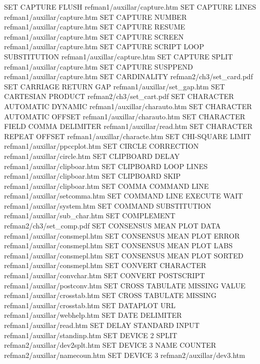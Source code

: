 SET CAPTURE FLUSH                       refman1/auxillar/capture.htm
SET CAPTURE LINES                       refman1/auxillar/capture.htm
SET CAPTURE NUMBER                      refman1/auxillar/capture.htm
SET CAPTURE RESUME                      refman1/auxillar/capture.htm
SET CAPTURE SCREEN                      refman1/auxillar/capture.htm
SET CAPTURE SCRIPT LOOP SUBSTITUTION    refman1/auxillar/capture.htm
SET CAPTURE SPLIT                       refman1/auxillar/capture.htm
SET CAPTURE SUSPPEND                    refman1/auxillar/capture.htm
SET CARDINALITY                         refman2/ch3/set_card.pdf
SET CARRIAGE RETURN GAP                 refman1/auxillar/set_gap.htm
SET CARTESIAN PRODUCT                   refman2/ch3/set_cart.pdf
SET CHARACTER AUTOMATIC DYNAMIC         refman1/auxillar/charauto.htm
SET CHARACTER AUTOMATIC OFFSET          refman1/auxillar/charauto.htm
SET CHARACTER FIELD COMMA DELIMITER     refman1/auxillar/read.htm
SET CHARACTER REPEAT OFFSET             refman1/auxillar/characte.htm
SET CHI-SQUARE LIMIT                    refman1/auxillar/ppccplot.htm
SET CIRCLE CORRECTION                   refman1/auxillar/circle.htm
SET CLIPBOARD DELAY                     refman1/auxillar/clipboar.htm
SET CLIPBOARD LOOP LINES                refman1/auxillar/clipboar.htm
SET CLIPBOARD SKIP                      refman1/auxillar/clipboar.htm
SET COMMA COMMAND LINE                  refman1/auxillar/setcomma.htm
SET COMMAND LINE EXECUTE WAIT           refman1/auxillar/system.htm
SET COMMAND SUBSTITUTION                refman1/auxillar/sub_char.htm
SET COMPLEMENT                          refman2/ch3/set_comp.pdf
SET CONSENSUS MEAN PLOT DATA            refman1/auxillar/consmepl.htm
SET CONSENSUS MEAN PLOT ERROR           refman1/auxillar/consmepl.htm
SET CONSENSUS MEAN PLOT LABS            refman1/auxillar/consmepl.htm
SET CONSENSUS MEAN PLOT SORTED          refman1/auxillar/consmepl.htm
SET CONVERT CHARACTER                   refman1/auxillar/convchar.htm
SET CONVERT POSTSCRIPT                  refman1/auxillar/postconv.htm
SET CROSS TABULATE MISSING VALUE        refman1/auxillar/crosstab.htm
SET CROSS TABULATE MISSING              refman1/auxillar/crosstab.htm
SET DATAPLOT URL                        refman1/auxillar/webhelp.htm
SET DATE DELIMITER                      refman1/auxillar/read.htm
SET DELAY STANDARD INPUT                refman1/auxillar/standinp.htm
SET DEVICE 2 SPLIT                      refman2/auxillar/dev2splt.htm
SET DEVICE 3 NAME COUNTER               refman2/auxillar/namecoun.htm
SET DEVICE 3                            refman2/auxillar/dev3.htm
